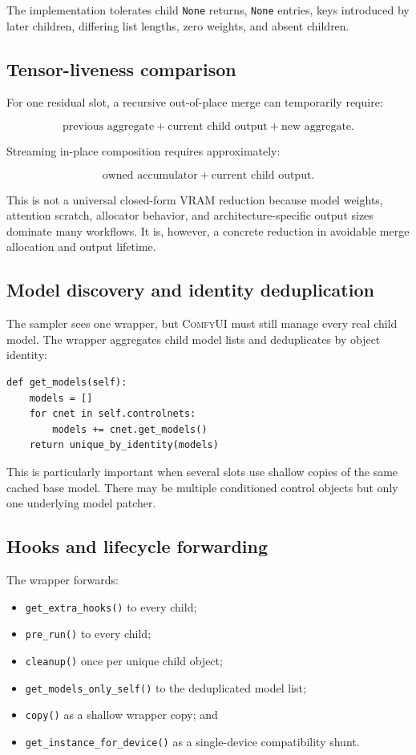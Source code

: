 \documentclass[11pt]{article}
\newcommand{\ComfyUI}{\textsc{ComfyUI}}
\newcommand{\code}[1]{\texttt{#1}}
\begin{document}
The implementation tolerates child \code{None} returns, \code{None} entries, keys introduced by later children, differing list lengths, zero weights, and absent children.

\subsection{Tensor-liveness comparison}

For one residual slot, a recursive out-of-place merge can temporarily require:

\[
\text{previous aggregate} + \text{current child output} + \text{new aggregate}.
\]

Streaming in-place composition requires approximately:

\[
\text{owned accumulator} + \text{current child output}.
\]

This is not a universal closed-form VRAM reduction because model weights, attention scratch, allocator behavior, and architecture-specific output sizes dominate many workflows. It is, however, a concrete reduction in avoidable merge allocation and output lifetime.

\subsection{Model discovery and identity deduplication}

The sampler sees one wrapper, but \ComfyUI{} must still manage every real child model. The wrapper aggregates child model lists and deduplicates by object identity:

\begin{lstlisting}[style=pythonstyle,caption={Unique child model discovery.}]
def get_models(self):
    models = []
    for cnet in self.controlnets:
        models += cnet.get_models()
    return unique_by_identity(models)
\end{lstlisting}

This is particularly important when several slots use shallow copies of the same cached base model. There may be multiple conditioned control objects but only one underlying model patcher.

\subsection{Hooks and lifecycle forwarding}

The wrapper forwards:

\begin{itemize}
  \item \code{get\_extra\_hooks()} to every child;
  \item \code{pre\_run()} to every child;
  \item \code{cleanup()} once per unique child object;
  \item \code{get\_models\_only\_self()} to the deduplicated model list;
  \item \code{copy()} as a shallow wrapper copy; and
  \item \code{get\_instance\_for\_device()} as a single-device compatibility shunt.
\end{itemize}
\end{document}
